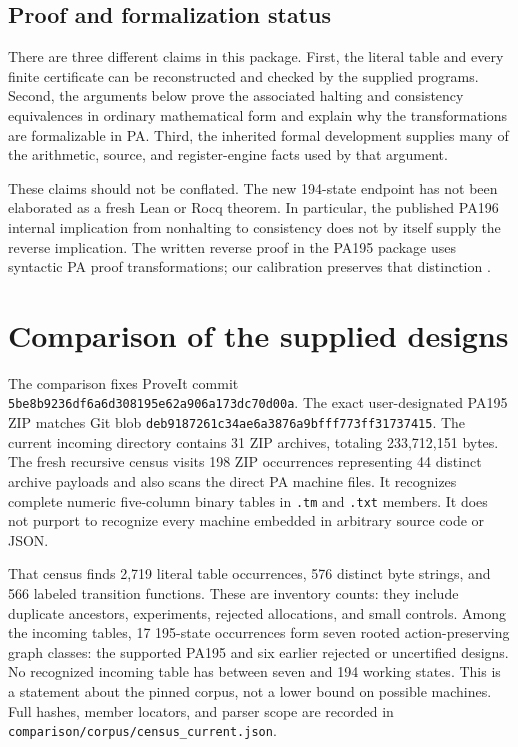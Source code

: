 \documentclass[11pt,letterpaper]{article}
\newcommand{\file}[1]{\texttt{\nolinkurl{#1}}}
\begin{document}
\subsection{Proof and formalization status}
There are three different claims in this package. First, the literal
table and every finite certificate can be reconstructed and checked by
the supplied programs. Second, the arguments below prove the associated
halting and consistency equivalences in ordinary mathematical form and
explain why the transformations are formalizable in PA. Third, the
inherited formal development supplies many of the arithmetic, source,
and register-engine facts used by that argument.

These claims should not be conflated. The new 194-state endpoint has not
been elaborated as a fresh Lean or Rocq theorem. In particular, the
published PA196 internal implication from nonhalting to consistency
does not by itself supply the reverse implication. The written reverse
proof in the PA195 package uses syntactic PA proof transformations;
our calibration preserves that distinction \cite{pa195,upstream}.

\section{Comparison of the supplied designs}
\label{sec:comparison}
The comparison fixes ProveIt commit
\file{5be8b9236df6a6d308195e62a906a173dc70d00a}.
The exact user-designated PA195 ZIP matches Git blob
\file{deb9187261c34ae6a3876a9bfff773ff31737415}.
The current incoming directory contains 31 ZIP archives, totaling
233,712,151 bytes. The fresh recursive census visits 198 ZIP occurrences
representing 44 distinct archive payloads and also scans the direct PA
machine files. It recognizes complete numeric five-column binary tables
in \file{.tm} and \file{.txt} members. It does not purport to recognize
every machine embedded in arbitrary source code or JSON.

That census finds 2,719 literal table occurrences, 576 distinct byte
strings, and 566 labeled transition functions. These are inventory
counts: they include duplicate ancestors, experiments, rejected
allocations, and small controls. Among the incoming tables, 17
195-state occurrences form seven rooted action-preserving graph classes:
the supported PA195 and six earlier rejected or uncertified designs.
No recognized incoming table has between seven and 194 working states.
This is a statement about the pinned corpus, not a lower bound on
possible machines. Full hashes, member locators, and parser scope are
recorded in \file{comparison/corpus/census_current.json}.
\end{document}
